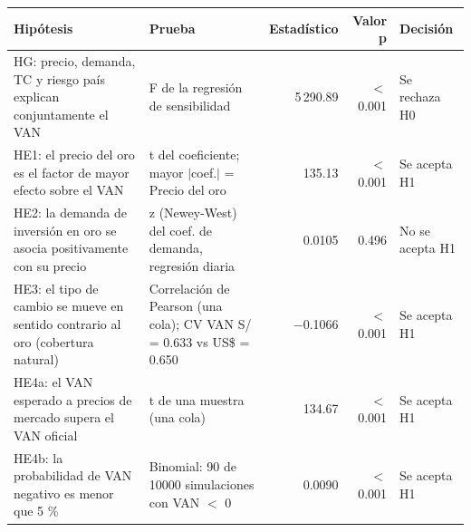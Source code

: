 \begin{tabularx}{\linewidth}{>{\raggedright\arraybackslash}X>{\raggedright\arraybackslash}Xrrl}
\toprule
Hipótesis & Prueba & Estadístico & Valor p & Decisión \\
\midrule
HG: precio, demanda, TC y riesgo país explican conjuntamente el VAN & F de la regresión de sensibilidad & 5\,290.89 & $<$0.001 & Se rechaza H0 \\
HE1: el precio del oro es el factor de mayor efecto sobre el VAN & t del coeficiente; mayor $|$coef.$|$ = Precio del oro & 135.13 & $<$0.001 & Se acepta H1 \\
HE2: la demanda de inversión en oro se asocia positivamente con su precio & z (Newey-West) del coef. de demanda, regresión diaria & 0.0105 & 0.496 & No se acepta H1 \\
HE3: el tipo de cambio se mueve en sentido contrario al oro (cobertura natural) & Correlación de Pearson (una cola); CV VAN S/ = 0.633 vs US\$ = 0.650 & $-$0.1066 & $<$0.001 & Se acepta H1 \\
HE4a: el VAN esperado a precios de mercado supera el VAN oficial & t de una muestra (una cola) & 134.67 & $<$0.001 & Se acepta H1 \\
HE4b: la probabilidad de VAN negativo es menor que 5 \% & Binomial: 90 de 10000 simulaciones con VAN $<$ 0 & 0.0090 & $<$0.001 & Se acepta H1 \\
\bottomrule
\end{tabularx}
